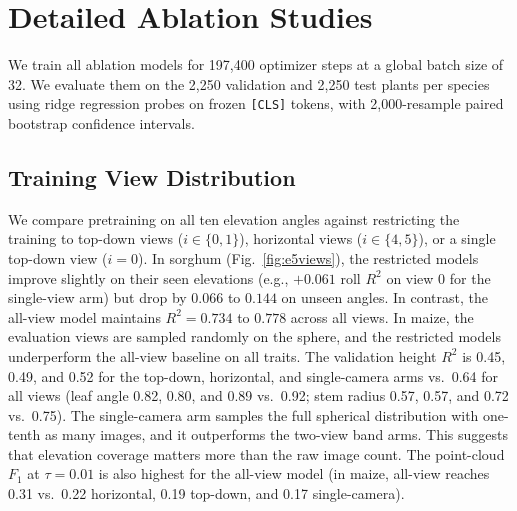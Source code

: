 \documentclass[10pt,twocolumn,letterpaper]{article}
\begin{document}
\section{Detailed Ablation Studies}
\label{app:ablations}

We train all ablation models for 197{,}400 optimizer steps at a global batch size of 32. We evaluate them on the 2{,}250 validation and 2{,}250 test plants per species using ridge regression probes on frozen \texttt{[CLS]} tokens, with 2{,}000-resample paired bootstrap confidence intervals.

\subsection{Training View Distribution}
\label{app:views-full}

We compare pretraining on all ten elevation angles against restricting the training to top-down views ($i \in \{0,1\}$), horizontal views ($i \in \{4,5\}$), or a single top-down view ($i = 0$). In sorghum (Fig.~\ref{fig:e5views}), the restricted models improve slightly on their seen elevations (e.g., $+0.061$ roll $R^2$ on view 0 for the single-view arm) but drop by $0.066$ to $0.144$ on unseen angles. In contrast, the all-view model maintains $R^2 = 0.734$ to $0.778$ across all views. In maize, the evaluation views are sampled randomly on the sphere, and the restricted models underperform the all-view baseline on all traits. The validation height $R^2$ is 0.45, 0.49, and 0.52 for the top-down, horizontal, and single-camera arms vs.\ 0.64 for all views (leaf angle 0.82, 0.80, and 0.89 vs.\ 0.92; stem radius 0.57, 0.57, and 0.72 vs.\ 0.75). The single-camera arm samples the full spherical distribution with one-tenth as many images, and it outperforms the two-view band arms. This suggests that elevation coverage matters more than the raw image count. The point-cloud $F_1$ at $\tau = 0.01$ is also highest for the all-view model (in maize, all-view reaches 0.31 vs.\ 0.22 horizontal, 0.19 top-down, and 0.17 single-camera).
\end{document}
